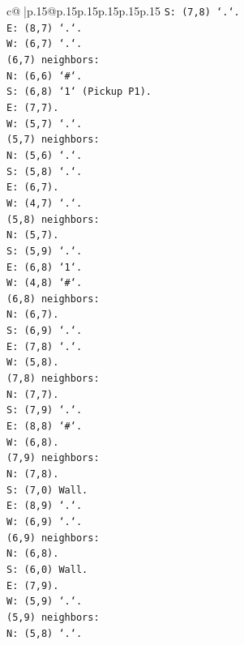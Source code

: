 \documentclass{article}
\begin{document}
{\begin{supertabular}{c@{$\;$}|p{.15\linewidth}@{}p{.15\linewidth}p{.15\linewidth}p{.15\linewidth}p{.15\linewidth}p{.15\linewidth}}
{{{\texttt{S: (7,8) `.`.} \\
\texttt{E: (8,7) `.`.} \\
\texttt{W: (6,7) `.`.} \\
\texttt{(6,7) neighbors:} \\
\texttt{N: (6,6) `\#`.} \\
\texttt{S: (6,8) `1` (Pickup P1).} \\
\texttt{E: (7,7).} \\
\texttt{W: (5,7) `.`.} \\
\texttt{(5,7) neighbors:} \\
\texttt{N: (5,6) `.`.} \\
\texttt{S: (5,8) `.`.} \\
\texttt{E: (6,7).} \\
\texttt{W: (4,7) `.`.} \\
\texttt{(5,8) neighbors:} \\
\texttt{N: (5,7).} \\
\texttt{S: (5,9) `.`.} \\
\texttt{E: (6,8) `1`.} \\
\texttt{W: (4,8) `\#`.} \\
\texttt{(6,8) neighbors:} \\
\texttt{N: (6,7).} \\
\texttt{S: (6,9) `.`.} \\
\texttt{E: (7,8) `.`.} \\
\texttt{W: (5,8).} \\
\texttt{(7,8) neighbors:} \\
\texttt{N: (7,7).} \\
\texttt{S: (7,9) `.`.} \\
\texttt{E: (8,8) `\#`.} \\
\texttt{W: (6,8).} \\
\texttt{(7,9) neighbors:} \\
\texttt{N: (7,8).} \\
\texttt{S: (7,0) Wall.} \\
\texttt{E: (8,9) `.`.} \\
\texttt{W: (6,9) `.`.} \\
\texttt{(6,9) neighbors:} \\
\texttt{N: (6,8).} \\
\texttt{S: (6,0) Wall.} \\
\texttt{E: (7,9).} \\
\texttt{W: (5,9) `.`.} \\
\texttt{(5,9) neighbors:} \\
\texttt{N: (5,8) `.`.} \\
}}}
\end{supertabular}}
\end{document}

